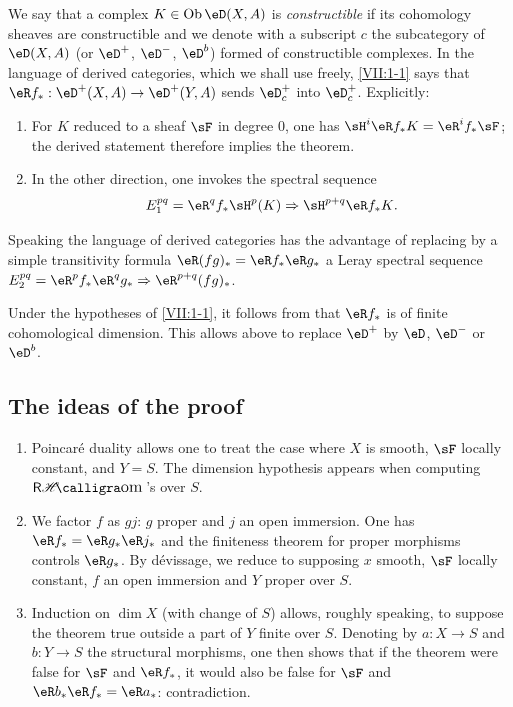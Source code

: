 We say that a complex $K\in\ob\eD(X,A)$ is \emph{constructible} if its
cohomology sheaves are constructible and we denote with a subscript
$c$ the subcategory of $\eD(X,A)$ (or $\eD^+$, $\eD^-$, $\eD^b$) formed
of constructible complexes. In the language of derived categories,
which we shall use freely, \ref{VII:1-1} says that
$\eR f_\ast:\eD^+(X,A) \to \eD^+(Y,A)$ sends $\eD_c^+$ into $\eD_c^+$.
Explicitly:
\begin{enumerate}[\indent a)]
  \item For $K$ reduced to a sheaf $\sF$ in degree $0$, one has
    $\sH^i\eR f_\ast K = \eR^i f_\ast \sF$; the derived statement therefore
    implies the theorem.
  \item In the other direction, one invokes the spectral sequence
    \[
      E_1^{p q} = \eR^q f_\ast \sH^p(K) \Rightarrow \sH^{p+q} \eR f_\ast K \text{.}
    \]
\end{enumerate}

Speaking the language of derived categories has the advantage of replacing by
a simple transitivity formula $\eR(f g)_\ast = \eR f_\ast \eR g_\ast$
a Leray spectral sequence
$E_2^{p q} = \eR^p f_\ast \eR^q g_\ast \Rightarrow \eR^{p+q} (f g)_\ast$.

Under the hypotheses of \ref{VII:1-1}, it follows from \cite{sga4} that
$\eR f_\ast$ is of finite cohomological dimension. This allows above to
replace $\eD^+$ by $\eD$, $\eD^-$ or $\eD^b$.




\subsection{The ideas of the proof}\label{VII:1-4}
\begin{enumerate}[\indent a)]
  \item Poincar\'e duality allows one to treat the case where $X$ is
    smooth, $\sF$ locally constant, and $Y=S$. The dimension hypothesis
    appears when computing $\rHom$'s over $S$.
  \item We factor $f$ as $g j$: $g$ proper and $j$ an open immersion. One has
    $\eR f_\ast = \eR g_\ast \eR j_\ast$ and the finiteness theorem for
    proper morphisms controls $\eR g_\ast$. By d\'evissage, we reduce to
    supposing $x$ smooth, $\sF$ locally constant, $f$ an open immersion
    and $Y$ proper over $S$.
  \item Induction on $\dim X$ (with change of $S$) allows, roughly
    speaking, to suppose the theorem true outside a part of $Y$ finite
    over $S$. Denoting by $a:X\to S$ and $b:Y\to S$ the structural morphisms, one
    then shows that if the theorem were false for $\sF$ and
    $\eR f_\ast$, it would also be false for $\sF$ and
    $\eR b_\ast \eR f_\ast = \eR a_\ast$: contradiction.
\end{enumerate}




